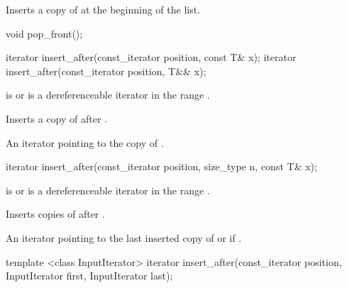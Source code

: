 \begin{itemdescr}
\pnum
\effects Inserts a copy of  at the beginning of the list.
\end{itemdescr}


%
%
\begin{itemdecl}
void pop_front();
\end{itemdecl}

\begin{itemdescr}
\pnum
\effects {}
\end{itemdescr}

%
%
\begin{itemdecl}
iterator insert_after(const_iterator position, const T& x);
iterator insert_after(const_iterator position, T&& x);
\end{itemdecl}

\begin{itemdescr}
\pnum
\requires {} is  or is a dereferenceable
iterator in the range .

\pnum
\effects Inserts a copy of  after .

\pnum
\returns An iterator pointing to the copy of .
\end{itemdescr}

%
%
\begin{itemdecl}
iterator insert_after(const_iterator position, size_type n, const T& x);
\end{itemdecl}

\begin{itemdescr}
\pnum
\requires {} is  or is a dereferenceable
iterator in the range .

\pnum
\effects Inserts  copies of  after .

\pnum
\returns
An iterator pointing to the last inserted copy of  or  if .
\end{itemdescr}

%
%
\begin{itemdecl}
template <class InputIterator>
  iterator insert_after(const_iterator position, InputIterator first, InputIterator last);
\end{itemdecl}

